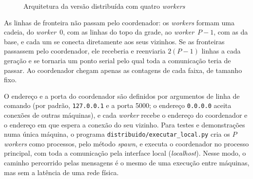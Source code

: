 \begin{figure}[!htb]
    \caption{Arquitetura da versão distribuída com quatro \textit{workers}}
    \label{fig:arquitetura-distribuida}
    \centering
    \fonte{}
\end{figure}

As linhas de fronteira não passam pelo coordenador: os \textit{workers} formam uma cadeia, do \textit{worker}~0, com as linhas do topo da grade, ao \textit{worker}~$P-1$, com as da base, e cada um se conecta diretamente aos seus vizinhos. Se as fronteiras passassem pelo coordenador, ele receberia e reenviaria $2(P-1)$ linhas a cada geração e se tornaria um ponto serial pelo qual toda a comunicação teria de passar. Ao coordenador chegam apenas as contagens de cada faixa, de tamanho fixo.

O endereço e a porta do coordenador são definidos por argumentos de linha de comando (por padrão, \texttt{127.0.0.1} e a porta 5000; o endereço \texttt{0.0.0.0} aceita conexões de outras máquinas), e cada \textit{worker} recebe o endereço do coordenador e o endereço em que espera a conexão do seu vizinho. Para testes e demonstrações numa única máquina, o programa \texttt{distribuido/executar\_local.py} cria os $P$ \textit{workers} como processos, pelo método \textit{spawn}, e executa o coordenador no processo principal, com toda a comunicação pela interface local (\textit{localhost}). Nesse modo, o caminho percorrido pelas mensagens é o mesmo de uma execução entre máquinas, mas sem a latência de uma rede física.

